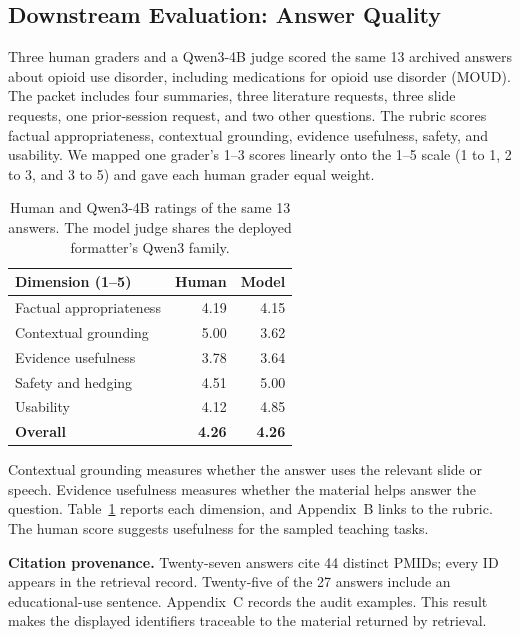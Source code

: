 \documentclass[11pt]{article}
\begin{document}
\subsection{Downstream Evaluation: Answer Quality}\label{sec:downstream}

Three human graders and a Qwen3-4B judge scored the same 13 archived answers about opioid use disorder, including medications for opioid use disorder (MOUD). The packet includes four summaries, three literature requests, three slide requests, one prior-session request, and two other questions. The rubric scores factual appropriateness, contextual grounding, evidence usefulness, safety, and usability. We mapped one grader's 1--3 scores linearly onto the 1--5 scale (1 to 1, 2 to 3, and 3 to 5) and gave each human grader equal weight.

\begin{table}[t]\centering\small\setlength{\tabcolsep}{5pt}
\begin{tabular}{@{}lrr@{}}\toprule
\textbf{Dimension (1--5)} & \textbf{Human} & \textbf{Model}\\\midrule
Factual appropriateness & 4.19 & 4.15 \\
Contextual grounding & 5.00 & 3.62 \\
Evidence usefulness & 3.78 & 3.64 \\
Safety and hedging & 4.51 & 5.00 \\
Usability & 4.12 & 4.85 \\
\textbf{Overall} & \textbf{4.26} & \textbf{4.26} \\
\bottomrule\end{tabular}
\caption{Human and Qwen3-4B ratings of the same 13 answers. The model judge shares the deployed formatter's Qwen3 family.}\label{tab:medtutor}
\end{table}

Contextual grounding measures whether the answer uses the relevant slide or speech. Evidence usefulness measures whether the material helps answer the question. Table~\ref{tab:medtutor} reports each dimension, and Appendix~B links to the rubric. The human score suggests usefulness for the sampled teaching tasks.

\textbf{Citation provenance.} Twenty-seven answers cite 44 distinct PMIDs; every ID appears in the retrieval record. Twenty-five of the 27 answers include an educational-use sentence. Appendix~C records the audit examples. This result makes the displayed identifiers traceable to the material returned by retrieval.
\end{document}

